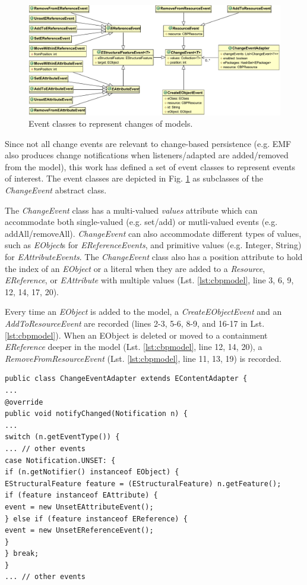 \documentclass[12pt, a4paper]{report} \usepackage[titletoc]{appendix}
\begin{document}
\begin{figure}[th]
	\centering
	\includegraphics[width=\linewidth]{events}
	\caption{Event classes to represent changes of models.}
	\label{fig:events}
\end{figure}

Since not all change events are relevant to change-based persistence (e.g. EMF also produces change notifications when listeners/adapted are added/removed from the model), this work has defined a set of event classes to represent events of interest. The event classes are depicted in Fig. \ref{fig:events} as subclasses of the \emph{ChangeEvent} abstract class. 

The \emph{ChangeEvent} class has a multi-valued \emph{values} attribute which can accommodate both single-valued (e.g. set/add) or mutli-valued events (e.g. addAll/removeAll). \emph{ChangeEvent} can also accommodate different types of values, such as \emph{EObject}s for \emph{EReferenceEvents}, and primitive values (e.g. Integer, String) for \emph{EAttributeEvents}. The \emph{ChangeEvent} class also has a position attribute to hold the index of an \emph{EObject} or a literal when they are added to a \emph{Resource}, \emph{EReference}, or \emph{EAttribute} with multiple values (Lst. \ref{lst:cbpmodel}, line 3, 6, 9, 12, 14, 17, 20). 

Every time an \emph{EObject} is added to the model, a \emph{CreateEObjectEvent} and an \emph{AddToResourceEvent} are recorded (lines 2-3, 5-6, 8-9, and 16-17 in Lst. \ref{lst:cbpmodel}). When an EObject is deleted or moved to a containment \emph{EReference} deeper in the model (Lst. \ref{lst:cbpmodel}, line 12, 14, 20), a \emph{RemoveFromResourceEvent} (Lst. \ref{lst:cbpmodel}, line 11, 13, 19) is recorded.

\begin{lstlisting}[style=java,caption={Simplified Java code to handle notification events.},label=lst:javacode]
public class ChangeEventAdapter extends EContentAdapter {
...
@override
public void notifyChanged(Notification n) {
...
switch (n.getEventType()) {
... // other events
case Notification.UNSET: {
if (n.getNotifier() instanceof EObject) {
EStructuralFeature feature = (EStructuralFeature) n.getFeature();
if (feature instanceof EAttribute) {
event = new UnsetEAttributeEvent();
} else if (feature instanceof EReference) {
event = new UnsetEReferenceEvent();
}
} break;
} 
... // other events
\end{lstlisting}
\end{document}
